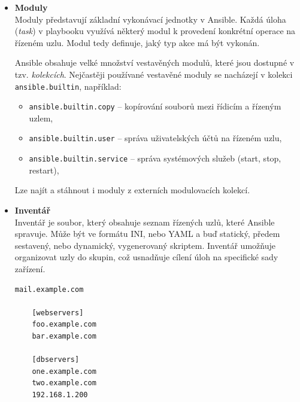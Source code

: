 \begin{itemize}
\begin{lstlisting}[language=YAML, caption={Ansible - ukázka playbooku}, label={lst:ansibleplaybook}, captionpos=b]
      tasks:
        - name: Ensure postgresql is at the latest version
          ansible.builtin.yum:
            name: postgresql
            state: latest

        - name: Ensure that postgresql is started
          ansible.builtin.service:
            name: postgresql
            state: started
    \end{lstlisting}


    \item \textbf{Moduly} \\
    Moduly představují základní vykonávací jednotky v Ansible. Každá úloha (\textit{task}) v playbooku využívá některý 
    modul k provedení konkrétní operace na řízeném uzlu. Modul tedy definuje, jaký typ akce má být vykonán.
    
    Ansible obsahuje velké množství vestavěných modulů, které jsou dostupné v tzv. \textit{kolekcích}. 
    Nejčastěji používané vestavěné moduly se nacházejí v kolekci \texttt{ansible.builtin}, například:

    \begin{itemize}
        \item \texttt{ansible.builtin.copy} – kopírování souborů mezi řídicím a řízeným uzlem,
        \item \texttt{ansible.builtin.user} – správa uživatelských účtů na řízeném uzlu,
        \item \texttt{ansible.builtin.service} – správa systémových služeb (start, stop, restart),
    \end{itemize}

    Lze najít a stáhnout i moduly z externích modulovacích kolekcí. \cite{ansibledocs}
    
    \item \textbf{Inventář} \\
    Inventář je soubor, který obsahuje seznam řízených uzlů, které Ansible spravuje.
    Může být ve formátu INI, nebo YAML a buď statický, předem sestavený, nebo dynamický, vygenerovaný skriptem.
    Inventář umožňuje organizovat uzly do skupin, což usnadňuje cílení úloh na specifické sady zařízení. \cite{ansibledocs}
    
    \begin{lstlisting}[caption={Ansible - ukázka INI inventáře}, label={lst:ansibleiniinventory}, captionpos=b]
    mail.example.com

    [webservers]
    foo.example.com
    bar.example.com

    [dbservers]
    one.example.com
    two.example.com
    192.168.1.200
    \end{lstlisting}


\end{itemize}
